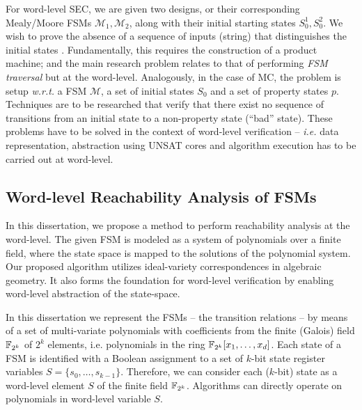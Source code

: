 For word-level SEC, we are given two designs, or their corresponding
Mealy/Moore FSMs ${\mathcal{M}}_1,{\mathcal{M}}_2$, along with their
initial starting states $S_0^1,S_0^2$. We wish to prove the absence of
a sequence of inputs (string) that distinguishes the initial
states \cite{coudert:iccad90,coudert1990verification}. Fundamentally, this requires 
the construction of a product machine; and the main research problem
relates to that of performing {\it FSM traversal} \cite{touati1990implicit}
but  at the word-level. Analogously, in the case of MC, the problem
is setup {\it w.r.t.} a FSM $\mathcal{M}$, a set of initial states $S_0$ and
a set of property states $p$. Techniques are to be researched that
verify that there exist no sequence of transitions from an initial
state to a non-property state (``bad'' state). These problems have to
be solved in the context of word-level verification -- {\it i.e.} data
representation, abstraction using UNSAT cores and
algorithm execution has to be carried out at word-level.


\subsection{Word-level Reachability Analysis of FSMs}
In this dissertation, we propose a method to perform reachability analysis at the word-level. 
	The given FSM is modeled as a system of polynomials over a finite field,
	where the state space is mapped to the solutions of the polynomial system.
	Our proposed algorithm utilizes ideal-variety correspondences in algebraic geometry.
	It also forms the foundation for word-level verification by enabling word-level abstraction of the
  state-space.

In this dissertation we represent
the FSMs -- the transition relations -- by means of a set of
multi-variate polynomials with coefficients from the finite (Galois)
field ${\mathbb{F}}_{2^k}$ of $2^k$ elements, i.e. polynomials in the ring
${\mathbb{F}}_{2^k}[x_1,\dots,x_d]$. Each state of a FSM is identified with a
Boolean assignment to a set of $k$-bit state register variables
$S=\{s_0,\dots,s_{k-1}\}$. Therefore, we can consider each ($k$-bit)
state as a word-level element $S$ of the finite field
${\mathbb{F}}_{2^k}$. Algorithms can directly operate on polynomials in word-level
variable $S$. 

